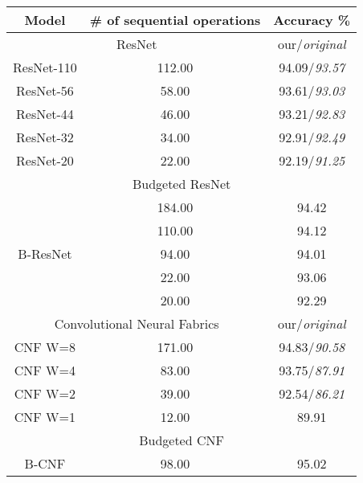 \begin{table}[h]
\centering
\begin{tabular}{|c||cc|}
\hline
Model                       & \# of sequential operations & Accuracy \%  \\ \hline \hline
\multicolumn{2}{|c|}{ResNet \cite{DBLP:journals/corr/HeZRS15}}                              & our/\textit{original} \\ \hline
ResNet-110                  & 112.00                      & 94.09/\textit{93.57}  \\
ResNet-56                   & 58.00                       & 93.61/\textit{93.03}  \\
ResNet-44                   & 46.00                       & 93.21/\textit{92.83}  \\
ResNet-32                   & 34.00                       & 92.91/\textit{92.49}  \\
ResNet-20                   & 22.00                       & 92.19/\textit{91.25}  \\ \hline \hline
\multicolumn{3}{|c|}{Budgeted ResNet}                                    \\ \hline
\multirow{5}{*}{B-ResNet}   & 184.00                      & 94.42        \\
                            & 110.00                      & 94.12        \\
                            & 94.00                       & 94.01        \\
                            & 22.00                       & 93.06        \\
                            & 20.00                       & 92.29        \\ \hline \hline
\multicolumn{2}{|c|}{Convolutional Neural Fabrics \cite{DBLP:journals/corr/SaxenaV16}}        & our/\textit{original} \\ \hline
CNF W=8                     & 171.00                      & 94.83/\textit{90.58}  \\
CNF W=4                     & 83.00                       & 93.75/\textit{87.91}  \\
CNF W=2                     & 39.00                       & 92.54/\textit{86.21}  \\
CNF W=1                     & 12.00                       & 89.91        \\ \hline \hline
\multicolumn{3}{|c|}{Budgeted CNF}                                       \\ \hline
\multirow{7}{*}{B-CNF}      & 98.00                       & 95.02        \\

\end{tabular}
\end{table}
